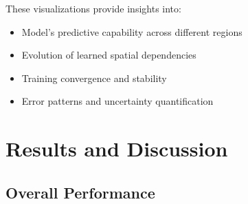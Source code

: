 \documentclass[lettersize, journal]{IEEEtran}
\begin{document}
These visualizations provide insights into:
\begin{itemize}
    \item Model's predictive capability across different regions
    \item Evolution of learned spatial dependencies
    \item Training convergence and stability
    \item Error patterns and uncertainty quantification
\end{itemize}

\section{Results and Discussion}

\subsection{Overall Performance}
\end{document}
